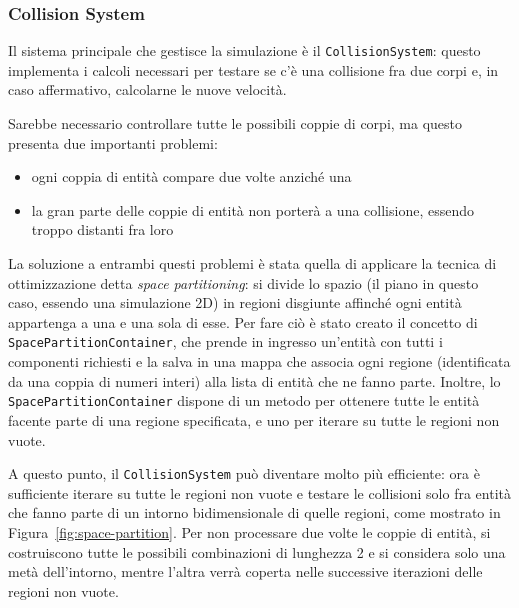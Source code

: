 \subsubsection{Collision System}
Il sistema principale che gestisce la simulazione è il \texttt{CollisionSystem}: questo implementa i calcoli necessari
per testare se c'è una collisione fra due corpi e, in caso affermativo, calcolarne le nuove velocità.

Sarebbe necessario controllare tutte le possibili coppie di corpi, ma questo presenta due importanti problemi:
\begin{itemize}
    \item ogni coppia di entità compare due volte anziché una
    \item la gran parte delle coppie di entità non porterà a una collisione, essendo troppo distanti fra loro
\end{itemize}

La soluzione a entrambi questi problemi è stata quella di applicare la tecnica di ottimizzazione detta
\textit{space partitioning}: si divide lo spazio (il piano in questo caso, essendo una simulazione 2D) in regioni disgiunte
affinché ogni entità appartenga a una e una sola di esse.
Per fare ciò è stato creato il concetto di \texttt{SpacePartitionContainer}, che prende in ingresso un'entità con
tutti i componenti richiesti e la salva in una mappa che associa ogni regione (identificata da una coppia di numeri interi)
alla lista di entità che ne fanno parte.
Inoltre, lo \texttt{SpacePartitionContainer} dispone di un metodo per ottenere tutte le entità facente parte di una regione
specificata, e uno per iterare su tutte le regioni non vuote.

A questo punto, il \texttt{CollisionSystem} può diventare molto più efficiente: ora è sufficiente iterare su tutte le regioni
non vuote e testare le collisioni solo fra entità che fanno parte di un intorno bidimensionale di quelle regioni, come
mostrato in Figura~\ref{fig:space-partition}.
Per non processare due volte le coppie di entità, si costruiscono tutte le possibili combinazioni di lunghezza 2 e si
considera solo una metà dell'intorno, mentre l'altra verrà coperta nelle successive iterazioni delle regioni non vuote.

